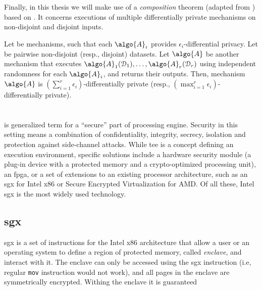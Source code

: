 				Finally, in this thesis we will make use of a \emph{composition} theorem (adapted from \cite{privacy-integrated-queries}) based on \cite{differential-privacy-original,our-data-ourselves}. %
				It concerns executions of multiple differentially private mechanisms on non-disjoint and disjoint inputs.

				\begin{theorem}\label{theorem:composition}
					Let  be mechanisms, such that each $\algo{A}_i$ provides $\epsilon_i$-differential privacy.
					Let  be pairwise non-disjoint (resp., disjoint) datasets.
					Let $\algo{A}$ be another mechanism that executes $\algo{A}_1(\database_1), \ldots, \algo{A}_r(\database_r)$ using independent randomness for each $\algo{A}_i$, and returns their outputs.
					Then, mechanism $\algo{A}$ is $\left( \sum_{i=1}^r \epsilon_i \right)$-differentially private (resp., $\left( \max_{i=1}^r \epsilon_i \right)$-differentially private).
				\end{theorem}

	\section{\texorpdfstring{}{Trusted Execution Environments}}

		 is generalized term for a ``secure'' part of processing engine.
		Security in this setting means a combination of confidentiality, integrity, secrecy, isolation and protection against side-channel attacks.
		While \acrshort{tee} is a concept defining an execution environment, specific solutions include a hardware security module (a plug-in device with a protected memory and a crypto-optimized processing unit), an \acrshort{fpga}, or a set of extensions to an existing processor architecture, such as an \acrshort{sgx} for Intel x86 or Secure Encrypted Virtualization \cite{amd-memory-encryption} for AMD\@.
		Of all these, Intel \acrshort{sgx} is the most widely used technology.

		\subsection{\texorpdfstring{\acrlong{sgx}}{Software Guard Extensions}}

			\acrfull{sgx} is a set of instructions for the Intel x86 architecture that allow a user or an operating system to define a region of protected memory, called \emph{enclave}, and interact with it.
			The enclave can only be accessed using the \acrshort{sgx} instruction (i.e, regular \texttt{mov} instruction would not work), and all pages in the enclave are symmetrically encrypted.
			Withing the enclave it is guaranteed 
